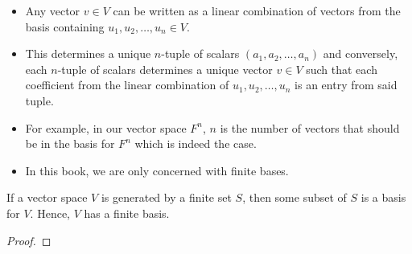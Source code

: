 \begin{itemize}
    \item Any vector \(  v \in V  \) can be written as a linear combination of vectors from the basis containing \( u_{1}, u_{2}, \dots, u_{n} \in V  \). 
    \item This determines a unique \( n  \)-tuple of scalars \( (a_{1}, a_{2}, \dots, a_{n}) \) and conversely, each \( n \)-tuple of scalars determines  a unique vector \( v \in V   \) such that each coefficient from the linear combination of \( u_{1}, u_{2}, \dots, u_{n}  \) is an entry from said tuple.
    \item For example, in our vector space \( F^{n} \), \( n  \) is the number of vectors that should be in the basis for \( F^{n} \) which is indeed the case.
    \item In this book, we are only concerned with finite bases.
\end{itemize}

\begin{theorem}[ ]
   If a vector space \( V  \) is generated by a finite set \( S  \), then some subset of \( S  \) is a basis for \( V  \). Hence, \( V  \) has a finite basis. 
\end{theorem}
\begin{proof}

\end{proof}


